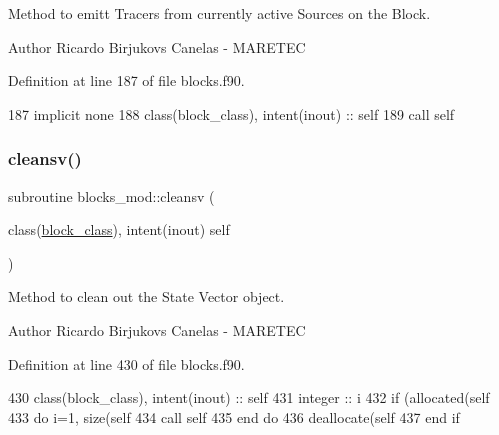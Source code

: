 Method to emitt Tracers from currently active Sources on the Block. 

\begin{DoxyAuthor}{Author}
Ricardo Birjukovs Canelas -\/ M\+A\+R\+E\+T\+EC 
\end{DoxyAuthor}


Definition at line 187 of file blocks.\+f90.


\begin{DoxyCode}
187     \textcolor{keywordtype}{implicit none}
188     \textcolor{keywordtype}{class}(block\_class), \textcolor{keywordtype}{intent(inout)} :: self
189     \textcolor{keyword}{call }self%
\end{DoxyCode}
\mbox{\label{namespaceblocks__mod_ab70bfe5cdce5a717115cfbac04f606a0}} 
\subsubsection{\texorpdfstring{cleansv()}{cleansv()}}
{\footnotesize\ttfamily subroutine blocks\+\_\+mod\+::cleansv (\begin{DoxyParamCaption}\item[{class(\mbox{\hyperlink{structblocks__mod_1_1block__class}{block\+\_\+class}}), intent(inout)}]{self }\end{DoxyParamCaption})\hspace{0.3cm}{\ttfamily [private]}}



Method to clean out the State Vector object. 

\begin{DoxyAuthor}{Author}
Ricardo Birjukovs Canelas -\/ M\+A\+R\+E\+T\+EC 
\end{DoxyAuthor}


Definition at line 430 of file blocks.\+f90.


\begin{DoxyCode}
430     \textcolor{keywordtype}{class}(block\_class), \textcolor{keywordtype}{intent(inout)} :: self
431     \textcolor{keywordtype}{integer} :: i
432     \textcolor{keywordflow}{if} (\textcolor{keyword}{allocated}(self%
433         \textcolor{keywordflow}{do} i=1, \textcolor{keyword}{size}(self%
434             \textcolor{keyword}{call }self%
435 \textcolor{keywordflow}{        end do}
436         \textcolor{keyword}{deallocate}(self%
437 \textcolor{keywordflow}{    end if}
\end{DoxyCode}
\mbox{\label{namespaceblocks__mod_a25ff530b5125e4cee5b1f474b2491883}} 
